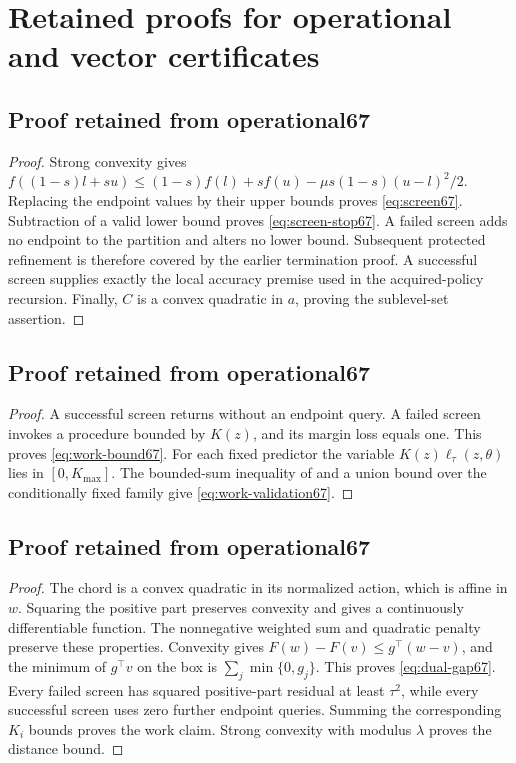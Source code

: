 \section{Retained proofs for operational and vector certificates}\label{supp:relocated69}
\subsection{Proof retained from operational67}\label{supp:relocated69-1}
\begin{proof}
Strong convexity gives $f((1-s)l+su)\le(1-s)f(l)+sf(u)-\mu s(1-s)(u-l)^2/2$. Replacing the endpoint values by their upper bounds proves \eqref{eq:screen67}. Subtraction of a valid lower bound proves \eqref{eq:screen-stop67}. A failed screen adds no endpoint to the partition and alters no lower bound. Subsequent protected refinement is therefore covered by the earlier termination proof. A successful screen supplies exactly the local accuracy premise used in the acquired-policy recursion. Finally, $C$ is a convex quadratic in $a$, proving the sublevel-set assertion.
\end{proof}

\subsection{Proof retained from operational67}\label{supp:relocated69-2}
\begin{proof}
A successful screen returns without an endpoint query. A failed screen invokes a procedure bounded by $K(z)$, and its margin loss equals one. This proves \eqref{eq:work-bound67}. For each fixed predictor the variable $K(z)\ell_\tau(z,\theta)$ lies in $[0,K_{\max}]$. The bounded-sum inequality of \citet{hoeffding1963} and a union bound over the conditionally fixed family give \eqref{eq:work-validation67}.
\end{proof}

\subsection{Proof retained from operational67}\label{supp:relocated69-3}
\begin{proof}
The chord is a convex quadratic in its normalized action, which is affine in $w$. Squaring the positive part preserves convexity and gives a continuously differentiable function. The nonnegative weighted sum and quadratic penalty preserve these properties. Convexity gives $F(w)-F(v)\le g^\top(w-v)$, and the minimum of $g^\top v$ on the box is $\sum_j\min\{0,g_j\}$. This proves \eqref{eq:dual-gap67}. Every failed screen has squared positive-part residual at least $\tau^2$, while every successful screen uses zero further endpoint queries. Summing the corresponding $K_i$ bounds proves the work claim. Strong convexity with modulus $\lambda$ proves the distance bound.
\end{proof}

